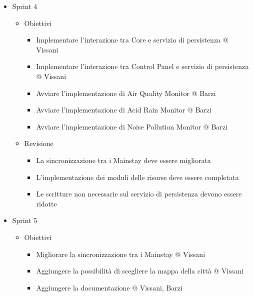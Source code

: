 \documentclass{scrartcl}
\begin{document}
\begin{itemize}
    \item Sprint 4
          \begin{itemize}
              \item Obiettivi
                    \begin{itemize}
                        \item Implementare l'interazione tra Core e servizio di persistenza @ Vissani
                        \item Implementare l'interazione tra Control Panel e servizio di persistenza @ Vissani
                        \item Avviare l'implementazione di Air Quality Monitor @ Barzi
                        \item Avviare l'implementazione di Acid Rain Monitor @ Barzi
                        \item Avviare l'implementazione di Noise Pollution Monitor @ Barzi
                    \end{itemize}
              \item Revisione
                    \begin{itemize}
                        \item La sincronizzazione tra i Mainstay deve essere migliorata
                        \item L'implementazione dei moduli delle risorse deve essere completata
                        \item Le scritture non necessarie sul servizio di persistenza devono essere ridotte
                    \end{itemize}
          \end{itemize}
\end{itemize}

\begin{itemize}
    \item Sprint 5
          \begin{itemize}
              \item Obiettivi
                    \begin{itemize}
                        \item Migliorare la sincronizzazione tra i Mainstay @ Vissani
                        \item Aggiungere la possibilità di scegliere la mappa della città @ Vissani
                        \item Aggiungere la documentazione @ Vissani, Barzi
                    \end{itemize}
          \end{itemize}
\end{itemize}
\end{document}
